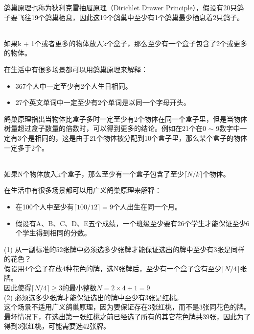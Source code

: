 \documentclass[12pt, openany, oneside]{book}
\begin{document}
鸽巢原理也称为狄利克雷抽屉原理（Dirichlet Drawer Principle），假设有20只鸽子要飞往19个鸽巢栖息，因此这19个鸽巢中至少有1个鸽巢最少栖息着2只鸽子。

\begin{tcolorbox}
	\\
	如果k + 1个或者更多的物体放入k个盒子，那么至少有一个盒子包含了2个或更多的物体。
\end{tcolorbox}

在生活中有很多场景都可以用鸽巢原理来解释：

\begin{itemize}
	\item 367个人中一定至少有2个人生日相同。
	\item 27个英文单词中一定至少有2个单词是以同一个字母开头。
\end{itemize}

鸽巢原理指出当物体比盒子多时一定至少有2个物体在同一个盒子里，但是当物体树量超过盒子数量的倍数时，可以得到更多的结论。例如在21个在0 $ \sim $ 9数字中一定有3个是相同的，这是由于21个物体被分配到10个盒子里，那么某个盒子的物体一定多于2个。

\begin{tcolorbox}
	\\
	如果N个物体放入k个盒子，那么至少有一个盒子包含了至少$ \lceil N / k \rceil $个物体。
\end{tcolorbox}

在生活中有很多场景都可以用广义鸽巢原理来解释：

\begin{itemize}
	\item 在100个人中至少有$ \lceil 100 / 12 \rceil = 9 $个人出生在同一个月。
	\item 假设有A、B、C、D、E五个成绩，一个班级至少要有26个学生才能保证至少6个学生得到相同的分数。
\end{itemize}

\begin{tcolorbox}
	(1) 从一副标准的52张牌中必须选多少张牌才能保证选出的牌中至少有3张是同样的花色？\\
	假设用4个盒子存放4种花色的牌，选N张牌后，至少有一个盒子含有至少$ \lceil N / 4 \rceil $张牌。\\
	因此使得$ \lceil N / 4 \rceil \ge 3 $的最小整数$ N = 2 \times 4 + 1 = 9 $\\

	(2) 必须选多少张牌才能保证选出的牌中至少有3张是红桃。\\
	这个场景不适用广义鸽巢原理，因为要保证存在3张红桃，而不是3张同花色的牌。\\
	最坏情况下，在选出第一张红桃之前已经选了所有的其它花色牌共39张，因此为了得到3张红桃，可能需要选42张牌。
\end{tcolorbox}
\end{document}
